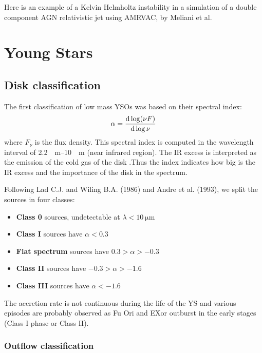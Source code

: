 \documentclass[10pt,a4paper,english,draft]{article}
\begin{document}
Here is an example of a Kelvin Helmholtz instability in a simulation of a double component AGN relativistic jet using AMRVAC, by Meliani et al.


\section{Young Stars}

\subsection{Disk classification}
The first classification of low mass YSOs was based on their spectral index:
\begin{equation}
  \alpha = \frac{\mathrm{d} \log (\nu F)}{\mathrm{d} \log \nu}
\end{equation}
where $F_\nu$ is the flux density.
This spectral index is computed in the wavelength interval of \SIrange{2.2}{10}{\mu\m} (near infrared region). The IR excess is interpreted as the emission of the cold gas of the disk .Thus the index indicates how big is the IR excess and the importance of the disk in the spectrum.


Following Lad C.J. and Wiling B.A. (1986) and Andre et al. (1993), we split the sources in four classes:
\begin{itemize}
\item \textbf{Class 0} sources, undetectable at $\lambda < \SI{10}{\micro\m}$
\item \textbf{Class I} sources have $\alpha < 0.3$
\item \textbf{Flat spectrum} sources have $0.3 > \alpha > -0.3$
\item \textbf{Class II} sources have $-0.3 > \alpha > -1.6$
\item \textbf{Class III} sources have $\alpha < -1.6$
\end{itemize}

The accretion rate is not continuous during the life of the YS and various episodes are probably observed as Fu Ori and EXor outburst in the early stages (Class I phase or Class II).


\subsubsection{Outflow classification}
\end{document}
